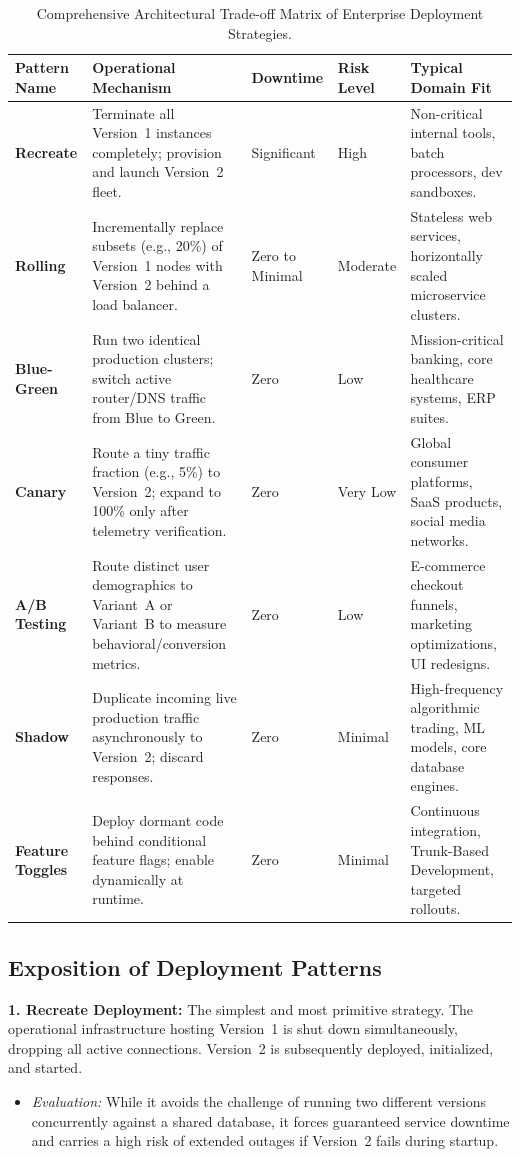 \documentclass[11pt,a4paper]{article}
\begin{document}
\begin{table}[htbp]
\centering
\footnotesize
\renewcommand{\arraystretch}{1.25}
\begin{tabularx}{\textwidth}{L{2.0cm} Y L{1.8cm} L{1.6cm} L{3.0cm}}
\toprule
{}
\textbf{Pattern Name} & \textbf{Operational Mechanism} & \textbf{Downtime} & \textbf{Risk Level} & \textbf{Typical Domain Fit} \\
\midrule
\textbf{Recreate} & Terminate all Version~1 instances completely; provision and launch Version~2 fleet. & Significant & High & Non-critical internal tools, batch processors, dev sandboxes. \\
\textbf{Rolling} & Incrementally replace subsets (e.g., 20\%) of Version~1 nodes with Version~2 behind a load balancer. & Zero to Minimal & Moderate & Stateless web services, horizontally scaled microservice clusters. \\
\textbf{Blue-Green} & Run two identical production clusters; switch active router/DNS traffic from Blue to Green. & Zero & Low & Mission-critical banking, core healthcare systems, ERP suites. \\
\textbf{Canary} & Route a tiny traffic fraction (e.g., 5\%) to Version~2; expand to 100\% only after telemetry verification. & Zero & Very Low & Global consumer platforms, SaaS products, social media networks. \\
\textbf{A/B Testing} & Route distinct user demographics to Variant~A or Variant~B to measure behavioral/conversion metrics. & Zero & Low & E-commerce checkout funnels, marketing optimizations, UI redesigns. \\
\textbf{Shadow} & Duplicate incoming live production traffic asynchronously to Version~2; discard responses. & Zero & Minimal & High-frequency algorithmic trading, ML models, core database engines. \\
\textbf{Feature Toggles} & Deploy dormant code behind conditional feature flags; enable dynamically at runtime. & Zero & Minimal & Continuous integration, Trunk-Based Development, targeted rollouts. \\
\bottomrule
\end{tabularx}
\caption{Comprehensive Architectural Trade-off Matrix of Enterprise Deployment Strategies.}
\label{tab:deployment_matrix}
\end{table}

\subsection{Exposition of Deployment Patterns}
\textbf{1. Recreate Deployment:} The simplest and most primitive strategy. The operational infrastructure hosting Version~1 is shut down simultaneously, dropping all active connections. Version~2 is subsequently deployed, initialized, and started.
\begin{itemize}
    \item \textit{Evaluation:} While it avoids the challenge of running two different versions concurrently against a shared database, it forces guaranteed service downtime and carries a high risk of extended outages if Version~2 fails during startup.
\end{itemize}
\end{document}
